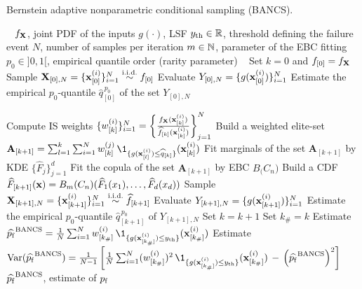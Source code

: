 \begin{algorithm}[h]
    \caption{Bernstein adaptive nonparametric conditional sampling (BANCS).}\label{alg:bancs}
    \footnotesize
    \begin{algorithmic}[1]
        \State {}\hfill~
        \State $f_{\bf X}$, joint PDF of the inputs
        \State $g(\cdot)$, LSF
        \State $y_\mathrm{th} \in \mathbb{R}$, threshold defining the failure event 
        \State $N$, number of samples per iteration
        \State $m \in \mathbb{N}$, parameter of the EBC fitting
        \State $p_0 \in ]0, 1[$, empirical quantile order (rarity parameter)
        \State {}\hfill~
        \State Set $k = 0$ and $f_{[0]} = f_{\bf X}$
        \State Sample ${\bf X}_{[0], N} = \{{\bf x}_{[0]}^{(i)}\}_{i=1}^N \overset{\text{i.i.d.}}{\sim} f_{[0]}$
        \State Evaluate $Y_{[0], N} = \{g({\bf x}_{[0]}^{(i)})\}_{i=1}^N$
        \State Estimate the empirical $p_0$-quantile $\widehat{q}_{[0]}^{\, p_0}$ of the set $Y_{[0], N}$
        
        \State Compute IS weights $\{w_{[k]}^{(i)}\}_{i=1}^N = \left\{\frac{f_{\bf X}({\bf x}_{[k]}^{(i)})}{\widehat{f}_{[k]}({\bf x}_{[k]}^{(i)})}\right\}_{j=1}^N$
        \State Build a weighted elite-set $\mathbf{A}_{[k+1]}=\sum_{l=1}^{k} \sum_{i=1}^N w_{[k]}^{(j)} \, \1_{\{g(\bx_{[l]}^{(i)}) \leq \widehat{q}_{[k]} \}}(\bx_{[k]}^{(i)})$
        \State Fit marginals of the set $\mathbf{A}_{[k+1]}$ by KDE $\{\widehat{F}_j\}_{j=1}^d$
        \State Fit the copula of the set $\mathbf{A}_{[k+1]}$ by EBC $B_\bm(C_n)$
        \State Build a CDF $\widehat{F}_{[k+1]}({\bf x}) = B_m(C_n)(\widehat{F}_1(x_1), \dots, \widehat{F}_d(x_d))$
        \State Sample ${\bf X}_{[k+1], N} = \{{\bf x}_{[k+1]}^{(i)}\}_{i=1}^N \overset{\text{i.i.d.}}{\sim} \widehat{f}_{[k+1]}$
        \State Evaluate $Y_{[k+1], N} = \{g({\bf x}_{[k+1]}^{(i)})\}_{i=1}^N$
        \State Estimate the empirical $p_0$-quantile $\widehat{q}_{[k+1]}^{\, p_0}$ of $Y_{[k+1], N}$
\State Set $k = k+1$
\EndWhile
\State Set $k_\# = k$
\State Estimate $\widehat{\pf}^{\mathrm{BANCS}} = \frac1N \sum_{i=1}^N w_{[k_\#]}^{(i)} \, \1_{\{g(\bx_{[k_\#]}^{(i)}) \leq \yth \}}(\bx_{[k_\#]}^{(i)})$
\State Estimate $\var(\widehat{\pf}^{\mathrm{BANCS}}) = \frac{1}{N-1} \left[\frac1N \sum_{i=1}^N (w_{[k_\#]}^{(i)})^2 \, \1_{\{g(\bx_{[k_\#]}^{(i)}) \leq \yth \}}(\bx_{[k_\#]}^{(i)}) \, - \, \left(\widehat{\pf}^{\mathrm{BANCS}}\right)^2\right]$
\State {}\hfill~
\State $\widehat{p_\mathrm{f}}^{\mathrm{BANCS}}$, estimate of $p_\mathrm{f}$
\end{algorithmic}
\end{algorithm}
